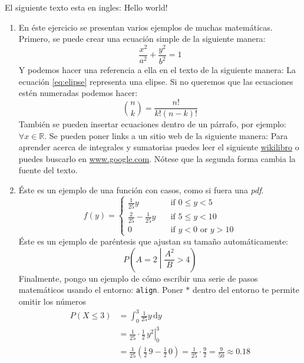 El siguiente texto esta en ingles: \textenglish{Hello world!}
\begin{enumerate}
 \item 
En éste ejercicio se presentan varios ejemplos de muchas matemáticas.
Primero, se puede crear una ecuación simple de la siguiente manera:
 \begin{equation}
 \label{eq:elipse}
 \frac{x^{2}}{a^{2}} + \frac{y^{2}}{b^{2}} = 1
 \end{equation}
Y podemos hacer una referencia a ella en el texto de la siguiente manera: La  ecuación \eqref{eq:elipse} representa una elipse.
Si no queremos que las ecuaciones estén numeradas podemos hacer:
 \begin{equation}
 \nonumber
 \binom{n}{k} = \frac{n!}{k!(n-k)!} 
 \end{equation}
También se pueden insertar ecuaciones dentro de un párrafo, por ejemplo: $\forall x \in \mathbb{R}$.
Se pueden poner links a un sitio web de la siguiente manera:
Para aprender acerca de integrales y sumatorias puedes leer el siguiente \href{https://en.wikibooks.org/wiki/LaTeX/Mathematics#Sums_and_integrals}{wikilibro} o puedes buscarlo en \url{www.google.com}.
Nótese que la segunda forma cambia la fuente del texto.
 
 \item Éste es un ejemplo de una función con casos, como si fuera una \emph{pdf}.
 \begin{equation}
  \label{eq:pdf}
  f(y) =
  \begin{cases}
    \frac{1}{25} y & \quad \text{if } 0 \leq y < 5 \\
    \frac{2}{25} - \frac{1}{25} y & \quad \text{if } 5 \leq y < 10 \\
    0 & \quad \text{if } y < 0 \text{ or } y > 10
  \end{cases}
 \end{equation}
Éste es un ejemplo de paréntesis que ajustan su tamaño automáticamente:
 \begin{equation}
  \nonumber
  P\left(A=2\middle|\frac{A^2}{B}>4\right)
 \end{equation}
Finalmente, pongo un ejemplo de cómo escribir una serie de pasos matemáticos usando el entorno: \verb|align|.
Poner $*$ dentro del entorno te permite omitir los números
\begin{align*}
P\left(X \leq 3 \right) &= \int_{0}^{3} \frac{1}{25} y \,\mathrm{d}y \\
     &= \left. \frac{1}{25} \cdot \frac{1}{2} \, y^{2} \right|_0^3 \\
     &= \frac{1}{25} \left( \frac{1}{2} \, 9 - \frac{1}{2} \, 0 \right) =
     \frac{1}{25} \cdot \frac{9}{2} = \frac{9}{50} \approx 0.18 
\end{align*}


\end{enumerate}
